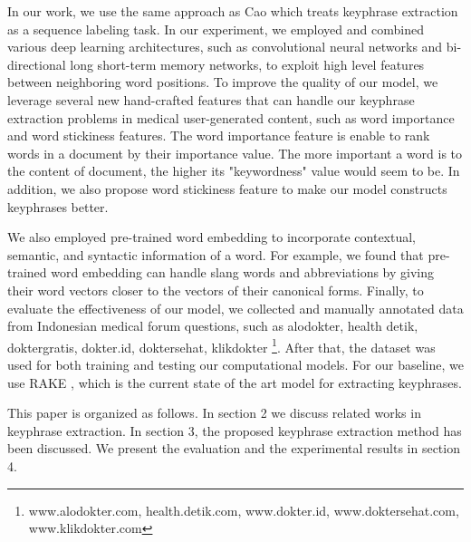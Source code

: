 In our work, we use the same approach as Cao \cite{cao2010automatically} which treats keyphrase extraction as a sequence labeling task. In our experiment, we employed and combined various deep learning architectures, such as convolutional neural networks and bi-directional long short-term memory networks, to exploit high level features between neighboring word positions. To improve the quality of our model, we leverage several new hand-crafted features that can handle our keyphrase extraction problems in medical user-generated content, such as word importance and word stickiness features. The word importance feature is enable to rank words in a document by their importance value. The more important a word is to the content of document, the higher its "keywordness" value would seem to be. In addition, we also propose word stickiness feature to make our model constructs keyphrases better. 

We also employed pre-trained word embedding to incorporate contextual, semantic, and syntactic information of a word. For example, we found that pre-trained word embedding can handle slang words and abbreviations by giving their word vectors closer to the vectors of their canonical forms. Finally, to evaluate the effectiveness of our model, we collected and manually annotated data from Indonesian medical forum questions, such as alodokter, health detik, doktergratis, dokter.id, doktersehat, klikdokter \footnote{www.alodokter.com, health.detik.com, www.dokter.id, www.doktersehat.com, www.klikdokter.com}. After that, the dataset was used for both training and testing our computational models. For our baseline, we use RAKE  \cite{rake}, which is the current state of the art model for extracting keyphrases.


This paper is organized as follows.  In section 2 we discuss related works in keyphrase extraction. In section 3, the proposed keyphrase extraction method has been discussed. We present the evaluation and the experimental results in section 4. 
\fi
